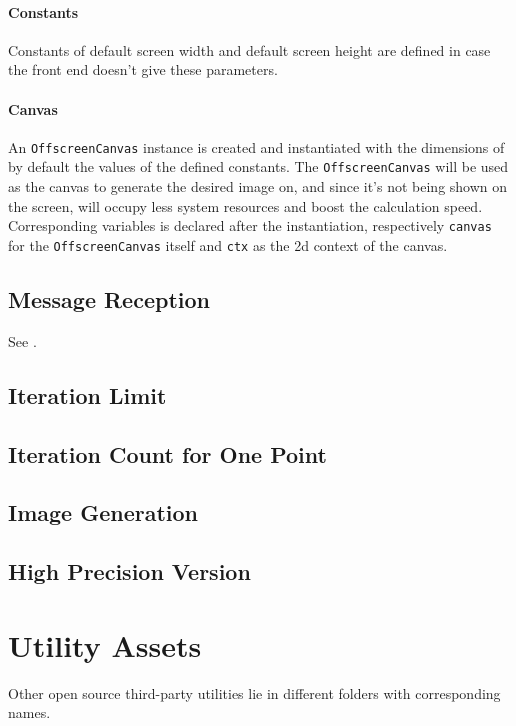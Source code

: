 \paragraph{Constants} Constants of default screen width and default screen height are defined in case the front end doesn't give these parameters.

\paragraph{Canvas} An \texttt{OffscreenCanvas} instance is created and instantiated with the dimensions of by default the values of the defined constants. The \texttt{OffscreenCanvas} will be used as the canvas to generate the desired image on, and since it's not being shown on the screen, will occupy less system resources and boost the calculation speed. Corresponding variables is declared after the instantiation, respectively \texttt{canvas} for the \texttt{OffscreenCanvas} itself and \texttt{ctx} as the 2d context of the canvas.

\subsection{Message Reception}

See .

\subsection{Iteration Limit}

\subsection{Iteration Count for One Point}

\subsection{Image Generation}

\subsection{High Precision Version}

\section{Utility Assets}

Other open source third-party utilities lie in different folders with corresponding names.

